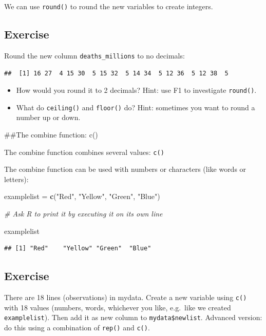 \documentclass[]{book}
\makeatletter
\newenvironment{Shaded}{\begin{snugshade}}{\end{snugshade}}
\newcommand{\CommentTok}[1]{\textcolor[rgb]{0.56,0.35,0.01}{\textit{#1}}}
\newcommand{\KeywordTok}[1]{\textcolor[rgb]{0.13,0.29,0.53}{\textbf{#1}}}
\newcommand{\NormalTok}[1]{#1}
\newcommand{\StringTok}[1]{\textcolor[rgb]{0.31,0.60,0.02}{#1}}
\newenvironment{kframe}{%
\medskip{}
\setlength{\fboxsep}{.8em}
 \def\at@end@of@kframe{}%
 \ifinner\ifhmode%
  \def\at@end@of@kframe{\end{minipage}}%
  \begin{minipage}{\columnwidth}%
 \fi\fi%
 \def\FrameCommand##1{\hskip\@totalleftmargin \hskip-\fboxsep
 \colorbox{shadecolor}{##1}\hskip-\fboxsep
     \hskip-\linewidth \hskip-\@totalleftmargin \hskip\columnwidth}%
 \MakeFramed {\advance\hsize-\width
   \@totalleftmargin\z@ \linewidth\hsize
   \@setminipage}}%
 {\par\unskip\endMakeFramed%
 \at@end@of@kframe}
\renewenvironment{Shaded}{\begin{kframe}}{\end{kframe}}
\theoremstyle{definition}
\theoremstyle{definition}
\theoremstyle{definition}
\theoremstyle{remark}
\makeatother
\begin{document}
We can use \texttt{round()} to round the new variables to create
integers.

\hypertarget{exercise-8}{%
\subsection{Exercise}\label{exercise-8}}

Round the new column \texttt{deaths\_millions} to no decimals:

\begin{verbatim}
##  [1] 16 27  4 15 30  5 15 32  5 14 34  5 12 36  5 12 38  5
\end{verbatim}

\begin{itemize}
\item
  How would you round it to 2 decimals? Hint: use F1 to investigate
  \texttt{round()}.
\item
  What do \texttt{ceiling()} and \texttt{floor()} do? Hint: sometimes
  you want to round a number up or down.
\end{itemize}

\#\#The combine function: c()

The combine function combines several values: \texttt{c()}

The combine function can be used with numbers or characters (like words
or letters):

\begin{Shaded}
\begin{Highlighting}[]
\NormalTok{examplelist =}\StringTok{ }\KeywordTok{c}\NormalTok{(}\StringTok{"Red"}\NormalTok{, }\StringTok{"Yellow"}\NormalTok{, }\StringTok{"Green"}\NormalTok{, }\StringTok{"Blue"}\NormalTok{)}

\CommentTok{# Ask R to print it by executing it on its own line}

\NormalTok{examplelist}
\end{Highlighting}
\end{Shaded}

\begin{verbatim}
## [1] "Red"    "Yellow" "Green"  "Blue"
\end{verbatim}

\hypertarget{exercise-9}{%
\subsection{Exercise}\label{exercise-9}}

There are 18 lines (observations) in mydata. Create a new variable using
\texttt{c()} with 18 values (numbers, words, whichever you like,
e.g.~like we created \texttt{examplelist}). Then add it as new column to
\texttt{mydata\$newlist}. Advanced version: do this using a combination
of \texttt{rep()} and \texttt{c()}.
\end{document}
